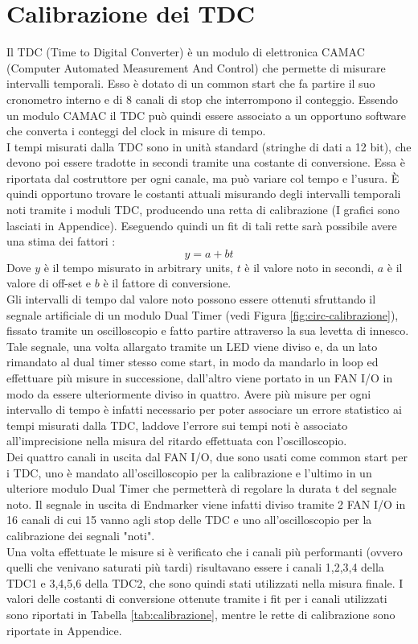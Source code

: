\documentclass{standalone}
\begin{document}
\section{Calibrazione dei TDC}
Il TDC (Time to Digital Converter) \`e un modulo di elettronica CAMAC (Computer Automated Measurement And Control) che permette di misurare intervalli temporali. Esso \`e dotato di un common start che fa partire il suo cronometro interno e di 8 canali di stop che interrompono il conteggio. Essendo un modulo CAMAC il TDC pu\`o quindi essere associato a un opportuno software che converta i conteggi del clock in misure di tempo.
\\
I tempi misurati dalla TDC sono in unit\`a standard (stringhe di dati a 12 bit), che devono poi essere tradotte in secondi tramite una costante di conversione. Essa \`e riportata dal costruttore per ogni canale, ma pu\`o variare col tempo e l'usura. \`E quindi opportuno trovare le costanti attuali misurando degli intervalli temporali noti tramite i moduli TDC, producendo una retta di calibrazione (I grafici sono lasciati in Appendice). Eseguendo quindi un fit di tali rette sar\`a possibile avere una stima dei fattori :
\begin{equation}
y=a+bt
\end{equation}
Dove $y$ \`e il tempo misurato in arbitrary units, $t$ \`e il valore noto in secondi, $a$ \`e il valore di off-set e $b$ \`e il fattore di conversione.
\\
Gli intervalli di tempo dal valore noto possono essere ottenuti sfruttando il segnale artificiale  di un modulo Dual Timer (vedi Figura \ref{fig:circ-calibrazione}), fissato tramite un oscilloscopio e fatto partire attraverso la sua levetta di innesco. Tale segnale, una volta allargato tramite un LED viene diviso e, da un lato rimandato al dual timer stesso come start, in modo da mandarlo in loop ed effettuare pi\`u misure in successione, dall'altro viene portato in un FAN I/O in modo da essere ulteriormente diviso in quattro. Avere pi\`u misure per ogni intervallo di tempo \`e infatti necessario per poter associare un errore statistico ai tempi misurati dalla TDC, laddove l'errore sui tempi noti \`e associato all'imprecisione nella misura del ritardo effettuata con l'oscilloscopio.\\
Dei quattro canali in uscita dal FAN I/O, due sono usati come common start per i TDC, uno \`e mandato all'oscilloscopio per la calibrazione e l'ultimo in un ulteriore modulo Dual Timer che permetter\`a di regolare la durata t del segnale noto. Il segnale in uscita di Endmarker viene infatti diviso tramite 2 FAN I/O in 16 canali di cui 15 vanno agli stop delle TDC e uno all'oscilloscopio per la calibrazione dei segnali "noti".\\
Una volta effettuate le misure si \`e verificato che i canali pi\`u performanti (ovvero quelli che venivano saturati pi\`u tardi) risultavano essere i canali 1,2,3,4 della TDC1 e 3,4,5,6 della TDC2, che sono quindi stati utilizzati nella misura finale. I valori delle costanti di conversione ottenute tramite i fit per i canali utilizzati sono riportati in Tabella \ref{tab:calibrazione}, mentre le rette di calibrazione sono riportate in Appendice.
\end{document}
